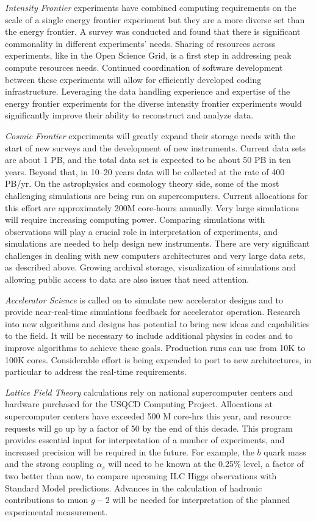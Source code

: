 {\it Intensity Frontier} experiments have combined computing requirements
on the scale of a single energy frontier experiment but they are a more
diverse set than the energy frontier. A survey was conducted and found that
there is significant commonality in different experiments' needs. Sharing of
resources across experiments, like in the Open Science Grid, is a first step
in addressing peak compute resources needs.  Continued coordination of
software development between these experiments will allow for efficiently
developed coding infrastructure.  Leveraging the data handling experience and
expertise of the energy frontier experiments for the diverse intensity
frontier experiments would significantly improve their ability to reconstruct
and analyze data.

{\it Cosmic Frontier} experiments will greatly expand their storage needs
with the start of new surveys and the development of new instruments.
Current data sets are about 1 PB, and the total data set is expected to be
about 50 PB in ten years. Beyond that, in 10--20 years data will be
collected at the rate of 400 PB/yr. On the astrophysics and cosmology
theory side, some of the most challenging simulations are being run on
supercomputers. 
Current allocations for this effort are approximately 200M core-hours annually.
Very large simulations will require increasing computing
power. Comparing simulations with observations will play a crucial role in
interpretation of experiments, and simulations are needed to help design
new instruments. There are very significant challenges in dealing with new
computers architectures and very large data sets, as described above.
Growing archival storage, visualization of simulations and allowing public
access to data are also issues that need attention.

{\it Accelerator Science} is called on to simulate new accelerator designs
and to provide near-real-time simulations feedback for accelerator
operation. 
Research into new algorithms and designs has potential to bring new ideas and
capabilities to the field.
It will be necessary to include additional physics in codes and
to improve algorithms to achieve these goals. Production runs can use from
10K to 100K cores. Considerable effort is being expended to port to new
architectures, in particular to address the real-time requirements.

{\it Lattice Field Theory} calculations rely on national supercomputer
centers and hardware purchased for the USQCD Computing Project. Allocations
at supercomputer centers have exceeded 500 M core-hrs this year, and
resource requests will go up by a factor of 50 by the end of this decade.
This program provides essential input for interpretation of a number of
experiments, and increased precision will be required in the future. For
example, the $b$ quark mass and the strong coupling $\alpha_s$ will need to
be known at the 0.25\% level, a factor of two better than now, to compare
upcoming ILC Higgs observations with Standard Model predictions. Advances
in the calculation of hadronic contributions to muon $g-2$ will be needed
for interpretation of the planned experimental measurement.

